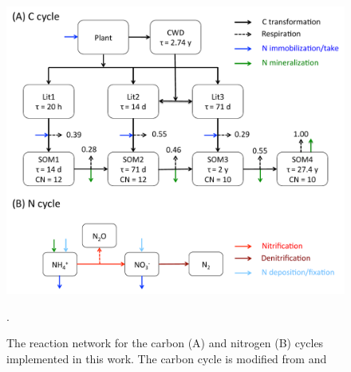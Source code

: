 \documentclass[gmd, manuscript]{copernicus}
\begin{document}







%

\clearpage
\begin{figure}[t]
\includegraphics[width=15cm]{../figs/fig01/fig01conceptualmodel.pdf}
\caption{The reaction network for the carbon (A) and nitrogen (B) cycles implemented in this work. The carbon cycle is modified from \citet{Thornton2005} and \citet{Bonan2012}}.
\label{fig:conceptualmodel}
\end{figure}
\end{document}
